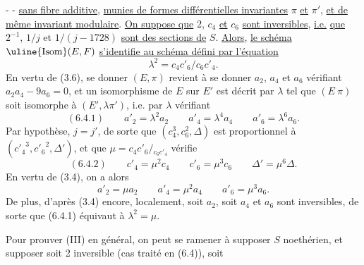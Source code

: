 -  -
\uline{sans fibre additive}, \uline{munies de formes différentielles invariantes} $\pi$ \uline{et} $\pi'$, \uline{et de même invariant modulaire}. \uline{On suppose que} 2, $c_4$ \uline{et} $c_6$ \uline{sont inversibles}, \uline{i.e.} \uline{que} $2^{-1}$, $1/j$ et $1/(j-1728)$ \uline{sont des sections de} $S$. \uline{Alors}, \uline{le schéma} $\uline{\mathrm{Isom}}(E,F)$ \uline{s'identifie au schéma défini par l'équation}
\[
\lambda^2=c_4c'_6/c_6c'_4.
\]
En vertu de (3.6), se donner $(E,\pi)$ revient à se donner $a_2$, $a_4$ et $a_6$ vérifiant $a_2a_4-9a_6=0$, et un isomorphisme de $E$ sur $E'$ est décrit par $\lambda$ tel que $(E\ \pi)$ soit isomorphe à $(E',\lambda\pi')$, i.e. par $\lambda$ vérifiant
\[
(6.4.1)\qquad a'_2=\lambda^2a_2\qquad a'_4=\lambda^4a_4\qquad a'_6=\lambda^6a_6.
\]
Par hypothèse, $j=j'$, de sorte que $(c_4^3,c_6^2,\Delta)$ est proportionnel à $({c'_4}^3,{c'_6}^2,\Delta')$, et que $\mu=c_4c'_6/{}_{c_6c'_4}$ vérifie
\[
(6.4.2)\qquad c'_4=\mu^2c_4\qquad c'_6=\mu^3c_6\qquad\Delta'=\mu^6\Delta.
\]
En vertu de (3.4), on a alors
\[
a'_2=\mu a_2\qquad a'_4=\mu^2a_4\qquad a'_6=\mu^3a_6.
\]
De plus, d'après (3.4) encore, localement, soit $a_2$, soit $a_4$ et $a_6$ sont inversibles, de sorte que (6.4.1) équivaut à $\lambda^2=\mu$.

Pour prouver (III) en général, on peut se ramener à supposer $S$ noethérien, et supposer soit 2 inversible (cas traité en (6.4)), soit
